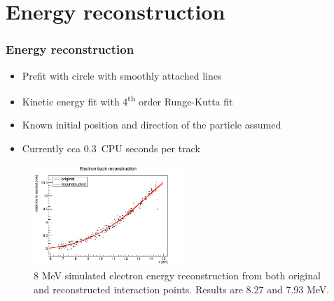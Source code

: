 \documentclass{beamer}
\begin{document}
	\section{Energy reconstruction}
	\begin{frame}
		\frametitle{Energy reconstruction}
		\begin{itemize}
			\item Prefit with circle with smoothly attached lines
			\item Kinetic energy fit with 4\textsuperscript{th} order Runge-Kutta fit
			\item Known initial position and direction of the particle assumed
			\item Currently cca 0.3~CPU seconds per track
		\end{itemize}
		\begin{figure}
			\centering
			\includegraphics[width=0.5\textwidth]{../images/reco_e.png}
			\caption{8 MeV simulated electron energy reconstruction from both original and reconstructed interaction points. Results are 8.27 and 7.93 MeV.}
		\end{figure}		
	\end{frame}
\end{document}
